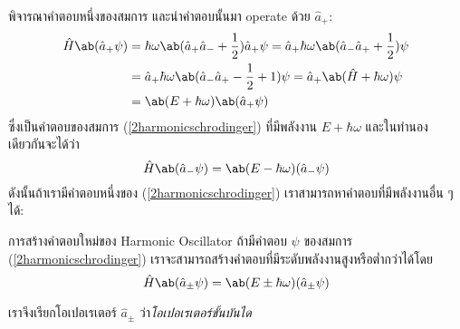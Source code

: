 พิจารณาคำตอบหนึ่งของสมการ และนำคำตอบนั้นมา operate ด้วย $\hat{a}_+$:
\begin{align*}
    \hat{H}\ab(\hat{a}_+\psi) &= \hbar\omega\ab(\hat{a}_+\hat{a}_- + \frac{1}{2})\hat{a}_+\psi = \hat{a}_+\hbar\omega\ab(\hat{a}_-\hat{a}_+ + \frac{1}{2})\psi\\
    &= \hat{a}_+\hbar\omega\ab(\hat{a}_-\hat{a}_+ - \frac{1}{2} + 1)\psi = \hat{a}_+\ab(\hat{H} + \hbar\omega)\psi\\
    &=\ab(E + \hbar\omega)\ab(\hat{a}_+\psi)
\end{align*}
ซึ่งเป็นคำตอบของสมการ (\ref{2harmonicschrodinger}) ที่มีพลังงาน $E + \hbar\omega$ และในทำนองเดียวกันจะได้ว่า
\[
\hat{H}\ab(\hat{a}_-\psi) = \ab(E - \hbar\omega)(\hat{a}_-\psi)
\]
ดังนั้นถ้าเรามีคำตอบหนึ่งของ (\ref{2harmonicschrodinger}) เราสามารถหาคำตอบที่มีพลังงานอื่น ๆ ได้:
\begin{lawbox}{การสร้างคำตอบใหม่ของ Harmonic Oscillator}
    ถ้ามีคำตอบ $\psi$ ของสมการ (\ref{2harmonicschrodinger}) เราจะสามารถสร้างคำตอบที่มีระดับพลังงานสูงหรือต่ำกว่าได้โดย
    \begin{equation}
        \hat{H}\ab(\hat{a}_\pm\psi) = \ab(E \pm \hbar\omega)(\hat{a}_\pm\psi)
    \end{equation}
\end{lawbox}
เราจึงเรียกโอเปอเรเตอร์ $\hat{a}_\pm$ ว่า\emph{โอเปอเรเตอร์ขั้นบันได}

